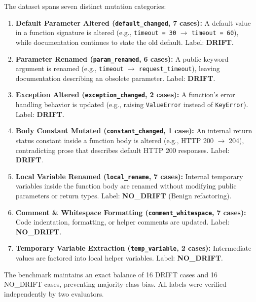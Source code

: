 \documentclass[12pt,onecolumn,draftclsnofoot]{IEEEtran}
\begin{document}
The dataset spans seven distinct mutation categories:
\begin{enumerate}
    \item \textbf{Default Parameter Altered (\texttt{default\_changed}, 7 cases):} A default value in a function signature is altered (e.g., \texttt{timeout = 30} $\to$ \texttt{timeout = 60}), while documentation continues to state the old default. Label: \textbf{DRIFT}.
    \item \textbf{Parameter Renamed (\texttt{param\_renamed}, 6 cases):} A public keyword argument is renamed (e.g., \texttt{timeout} $\to$ \texttt{request\_timeout}), leaving documentation describing an obsolete parameter. Label: \textbf{DRIFT}.
    \item \textbf{Exception Altered (\texttt{exception\_changed}, 2 cases):} A function's error handling behavior is updated (e.g., raising \texttt{ValueError} instead of \texttt{KeyError}). Label: \textbf{DRIFT}.
    \item \textbf{Body Constant Mutated (\texttt{constant\_changed}, 1 case):} An internal return status constant inside a function body is altered (e.g., HTTP 200 $\to$ 204), contradicting prose that describes default HTTP 200 responses. Label: \textbf{DRIFT}.
    \item \textbf{Local Variable Renamed (\texttt{local\_rename}, 7 cases):} Internal temporary variables inside the function body are renamed without modifying public parameters or return types. Label: \textbf{NO\_DRIFT} (Benign refactoring).
    \item \textbf{Comment \& Whitespace Formatting (\texttt{comment\_whitespace}, 7 cases):} Code indentation, formatting, or helper comments are updated. Label: \textbf{NO\_DRIFT}.
    \item \textbf{Temporary Variable Extraction (\texttt{temp\_variable}, 2 cases):} Intermediate values are factored into local helper variables. Label: \textbf{NO\_DRIFT}.
\end{enumerate}
The benchmark maintains an exact balance of 16 DRIFT cases and 16 NO\_DRIFT cases, preventing majority-class bias. All labels were verified independently by two evaluators.
\end{document}

